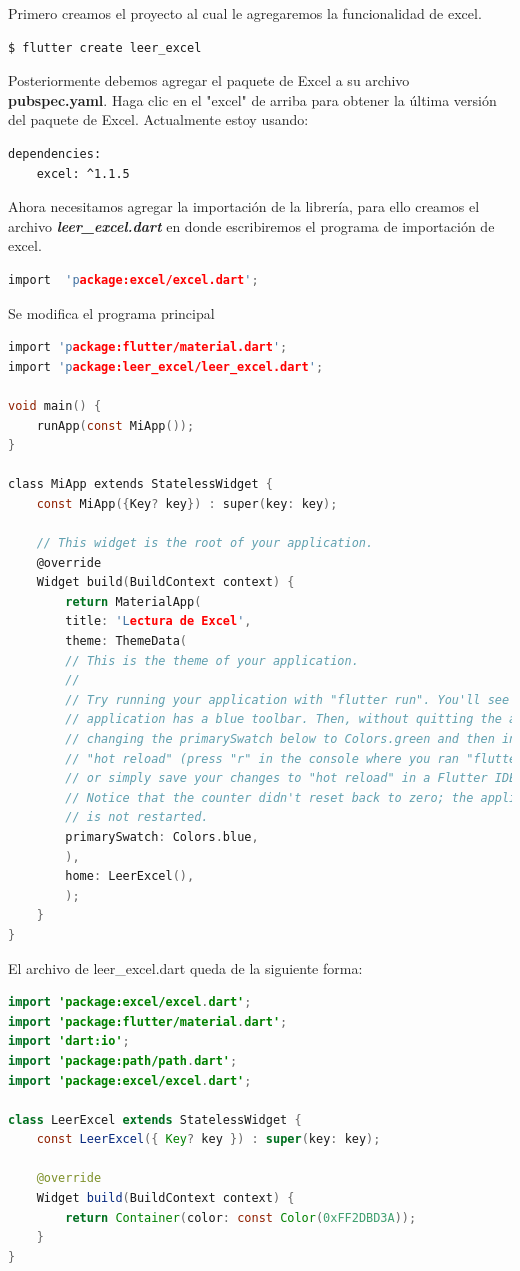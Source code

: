 Primero creamos el proyecto al cual le agregaremos la funcionalidad de excel.


\begin{lstlisting}[language=bash]
$ flutter create leer_excel
\end{lstlisting}

 Posteriormente debemos agregar el paquete de Excel a su archivo \textbf{pubspec.yaml}. Haga clic en el "excel" de arriba para obtener la última versión del paquete de Excel. Actualmente estoy usando:

\begin{lstlisting}[language=bash]
dependencies:
	excel: ^1.1.5
\end{lstlisting}

Ahora necesitamos agregar la importación de la librería, para ello creamos el archivo \textbf{\textit{leer\_excel.dart}} en donde escribiremos el programa de importación de excel.

\begin{lstlisting}[language=c]
import  'package:excel/excel.dart';
\end{lstlisting}

Se modifica el programa principal

\begin{lstlisting}[language=c]
import 'package:flutter/material.dart';
import 'package:leer_excel/leer_excel.dart';

void main() {
	runApp(const MiApp());
}

class MiApp extends StatelessWidget {
	const MiApp({Key? key}) : super(key: key);
	
	// This widget is the root of your application.
	@override
	Widget build(BuildContext context) {
		return MaterialApp(
		title: 'Lectura de Excel',
		theme: ThemeData(
		// This is the theme of your application.
		//
		// Try running your application with "flutter run". You'll see the
		// application has a blue toolbar. Then, without quitting the app, try
		// changing the primarySwatch below to Colors.green and then invoke
		// "hot reload" (press "r" in the console where you ran "flutter run",
		// or simply save your changes to "hot reload" in a Flutter IDE).
		// Notice that the counter didn't reset back to zero; the application
		// is not restarted.
		primarySwatch: Colors.blue,
		),
		home: LeerExcel(),
		);
	}
}
\end{lstlisting}

El archivo de leer\_excel.dart queda de la siguiente forma:

\begin{lstlisting}[language=java]
import 'package:excel/excel.dart';
import 'package:flutter/material.dart';
import 'dart:io';
import 'package:path/path.dart';
import 'package:excel/excel.dart';

class LeerExcel extends StatelessWidget {
	const LeerExcel({ Key? key }) : super(key: key);
	
	@override
	Widget build(BuildContext context) {
		return Container(color: const Color(0xFF2DBD3A));
	}
}
\end{lstlisting}

